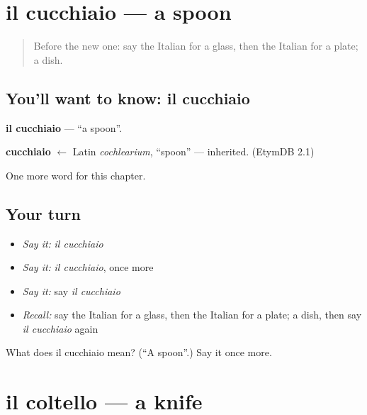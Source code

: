 \section[il cucchiaio]{il cucchiaio — a spoon}

\label{lesson:IT-C59-cucchiaio}



\begin{quote}
Before the new one: say the Italian for a glass, then the Italian for a plate; a dish.
\end{quote}

\subsection*{You'll want to know: il cucchiaio}
\textbf{il cucchiaio} — \textquotedblleft{}a spoon\textquotedblright{}.

\begin{cousinweb}
\textbf{cucchiaio} $\leftarrow$ Latin \emph{cochlearium}, \textquotedblleft{}spoon\textquotedblright{} — inherited. (EtymDB 2.1)
\end{cousinweb}

\begin{grammarlens}[title={What you've built}]
One more word for this chapter.
\end{grammarlens}

\subsection*{Your turn}
\begin{itemize}
\raggedright
  \item \emph{Say it:} \emph{il cucchiaio}
  \item \emph{Say it:} \emph{il cucchiaio}, once more
  \item \emph{Say it:} say \emph{il cucchiaio}
  \item \emph{Recall:} say the Italian for a glass, then the Italian for a plate; a dish, then say \emph{il cucchiaio} again
\end{itemize}

\begin{tcolorbox}[breakable,colback=teal!4,colframe=teal!35!black,title={Before you move on}]
What does il cucchiaio mean? (\textquotedblleft{}A spoon\textquotedblright{}.) Say it once more.
\end{tcolorbox}
\section[il coltello]{il coltello — a knife}

